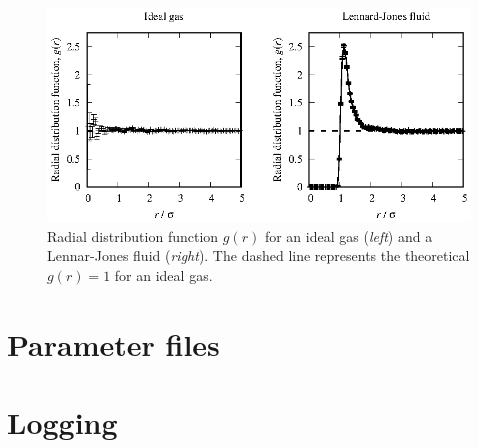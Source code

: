 \begin{figure}
  \includegraphics[width = \textwidth]{figures/Lennard-Jones.rdf.eps}
  \caption{\label{Lennard-Jones.rdf}Radial distribution function $g(r)$ for an
           ideal gas (\textit{left}) and a Lennar-Jones fluid (\textit{right}).
           The dashed line represents the theoretical $g(r) = 1$ for an ideal
           gas.}
\end{figure}

\section{Parameter files}

\section{Logging}

